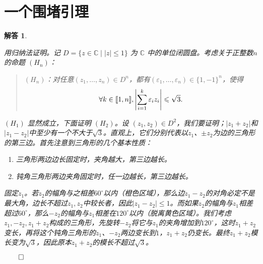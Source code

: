 \documentclass[12pt,UTF8]{ctexbook}
\theoremstyle{exercisestyle}
\theoremstyle{solutionstyle}
\newtheorem*{solution*}{解答}
\newenvironment{solution}
  {\begin{solution*}}
  {\hfill\ensuremath{\qed}\end{solution*}}
\begin{document}
\section{一个围堵引理}
\begin{solution}
\begin{subquestions}
\item 用归纳法证明。记 \( D = \{z \in \mathbb{C} \mid |z| \leqslant 1\} \) 为 \( \mathbb{C} \) 中的单位闭圆盘。考虑关于正整数$n$的命题 \( (H_n) \)：
\begin{quotation}
  $(H_n) $：对任意$(z_1, \ldots, z_n) \in D^n$，都有$(\varepsilon_1, \ldots, \varepsilon_n) \in \{1, -1\}^n$，使得
  $$ \forall k \in [\![1,n]\!], \left| \sum_{i=1}^k \varepsilon_i z_i \right| \leqslant \sqrt{3}. $$
\end{quotation}

\( (H_1) \) 显然成立，下面证明 \( (H_2) \)。设 \( (z_1, z_2) \in D^2 \)，我们要证明；$|z_1 + z_2|$和$|z_1 - z_2|$中至少有一个不大于$\sqrt{3}$。直观上，它们分别代表以$z_1$、$\pm z_2$为边的三角形的第三边。首先注意到三角形的几个基本性质：
\begin{enumerate}[label=\arabic*.]
  \item 三角形两边边长固定时，夹角越大，第三边越长。
  \item 钝角三角形两边夹角固定时，任一边越长，第三边越长。
\end{enumerate}
固定$z_1$。若$z_2$的幅角与之相差$60^\circ$以内（橙色区域），那么边$z_1 - z_2$的对角必定不是最大角，边长不超过$z_1,z_2$中较长者，因此$|z_1 - z_2| \leqslant 1$。而如果$z_2$的幅角与$z_1$相差超过$60^\circ$，那么$-z_2$的幅角与$z_1$相差在$120^\circ$以内（脱离黄色区域）。我们考虑$z_1, -z_2, z_1 + z_2$构成的三角形，先旋转$-z_2$将它与$z_1$的夹角增加到$120^\circ$，这时$z_1+z_2$变长，再将这个钝角三角形的$z_1$、$-z_2$两边变长到$1$，$z_1+z_2$仍变长。最终$z_1+z_2$模长变为$\sqrt{3}$，因此原本$z_1 + z_2$的模长不超过$\sqrt{3}$。

\begin{minipage}[t]{0.4\textwidth}
\centering
\end{minipage}
\end{subquestions}
\end{solution}
\end{document}
